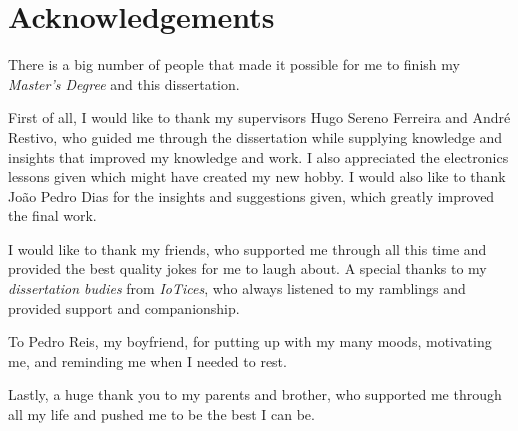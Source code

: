 \chapter*{Acknowledgements}

There is a big number of people that made it possible for me to finish my \textit{Master's Degree} and this dissertation.

First of all, I would like to thank my supervisors Hugo Sereno Ferreira and André Restivo, who guided me through the dissertation while supplying knowledge and insights that improved my knowledge and work. I also appreciated the electronics lessons given which might have created my new hobby. I would also like to thank João Pedro Dias for the insights and suggestions given, which greatly improved the final work.

I would like to thank my friends, who supported me through all this time and provided the best quality jokes for me to laugh about. A special thanks to my \textit{dissertation budies} from \textit{IoTices}, who always listened to my ramblings and provided support and companionship. 

To Pedro Reis, my boyfriend, for putting up with my many moods, motivating me, and reminding me when I needed to rest.

Lastly, a huge thank you to my parents and brother, who supported me through all my life and pushed me to be the best I can be. 

\vspace{10mm}
